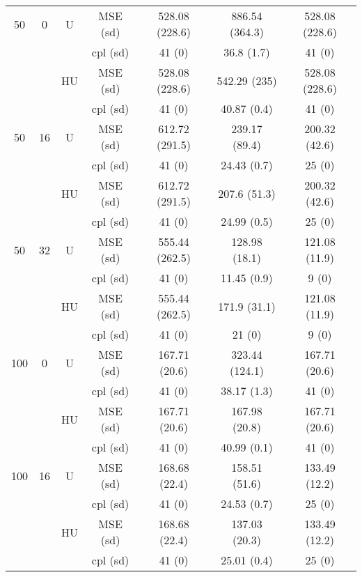 \documentclass[11pt,a4paper]{article}
\begin{document}
\begin{table}[h!]
\begin{tabular}{|c|c|c|c|c|c|c|}
50 & 0 & U&MSE (sd) & 528.08 (228.6) & 886.54 (364.3) & 528.08 (228.6) \\
& & & cpl (sd) & 41 (0) & 36.8 (1.7) & 41 (0) \\
 &  & HU &MSE (sd) & 528.08 (228.6) & 542.29 (235) & 528.08 (228.6) \\
& & & cpl (sd) & 41 (0) & 40.87 (0.4) & 41 (0) \\
\hline %
50 & 16 & U&MSE (sd) & 612.72 (291.5) & 239.17 (89.4) & 200.32 (42.6) \\	
& & & cpl (sd) & 41 (0) & 24.43 (0.7) & 25 (0) \\
 &  &HU &MSE (sd) & 612.72 (291.5) & 207.6 (51.3) & 200.32 (42.6) \\
& & & cpl (sd) & 41 (0) & 24.99 (0.5) & 25 (0) \\
\hline %
50 & 32 & U&MSE (sd) & 555.44 (262.5) & 128.98 (18.1) & 121.08 (11.9) \\
& & & cpl (sd) & 41 (0) & 11.45 (0.9) & 9 (0) \\
 &  &HU &MSE (sd) & 555.44 (262.5) & 171.9 (31.1) & 121.08 (11.9) \\
& & &cpl (sd) & 41 (0) & 21 (0) & 9 (0) \\
\hline
\hline %
100 & 0 & U& MSE (sd) & 167.71 (20.6) & 323.44 (124.1) & 167.71 (20.6) \\
& & & cpl (sd) & 41 (0) & 38.17 (1.3) & 41 (0) \\
 &  &HU &MSE (sd) & 167.71 (20.6) & 167.98 (20.8) & 167.71 (20.6) \\  
& & & cpl (sd) & 41 (0) & 40.99 (0.1) & 41 (0) \\
\hline %
100 & 16 & U&  MSE (sd) & 168.68 (22.4) & 158.51 (51.6) & 133.49 (12.2) \\
& & & cpl (sd) & 41 (0) & 24.53 (0.7) & 25 (0) \\
 &  &HU &  MSE (sd) & 168.68 (22.4) & 137.03 (20.3) & 133.49 (12.2) \\
& & & cpl (sd) & 41 (0) & 25.01 (0.4) & 25 (0) \\

\end{tabular}
\end{table}
\end{document}
